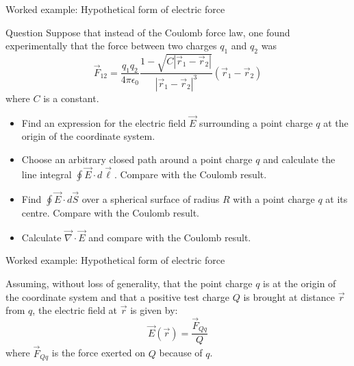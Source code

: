%
%

{
\problemslide

%
%
%

\begin{frame}{Worked example: Hypothetical form of electric force}

  \begin{blockexmplque}{Question}
    Suppose that instead of the Coulomb force law, one found experimentally
    that the force between two charges $q_1$ and $q_2$ was
    \begin{equation*}
        \vec{F}_{12} = \frac{q_1 q_2}{4\pi \epsilon_0}
         \frac{1 - \sqrt{C|\vec{r}_1-\vec{r}_2|}}{|\vec{r}_1-\vec{r}_2|^3}
          (\vec{r}_1-\vec{r}_2)
    \end{equation*}
    where $C$ is a constant.
    \begin{itemize}
      \item
      Find an expression for the electric field $\vec{E}$
      surrounding a point charge $q$ at the origin of the coordinate system.
      \item
      Choose an arbitrary closed path around a point charge $q$ and calculate
      the line integral $\oint \vec{E} \cdot d\vec{\ell}$.
      Compare with the Coulomb result.
      \item
      Find $\oint \vec{E} \cdot d\vec{S}$ over a spherical surface of radius
      $R$ with a point charge $q$ at its centre.
      Compare with the Coulomb result.
      \item
      Calculate $\vec{\nabla} \cdot \vec{E}$ and compare with the Coulomb result.
    \end{itemize}
  \end{blockexmplque}

\end{frame}

%
%
%

\begin{frame}{Worked example: Hypothetical form of electric force}

  Assuming, without loss of generality, that the
  point charge $q$ is at the origin of the coordinate system
  and that a positive test charge $Q$
  is brought at distance $\vec{r}$ from $q$,
  the electric field at $\vec{r}$ is given by:
  \begin{equation*}
    \vec{E}(\vec{r}) = \frac{\vec{F}_{Qq}}{Q}
  \end{equation*}
  where $\vec{F}_{Qq}$ is the force exerted on $Q$ because of $q$.


\end{frame}}

